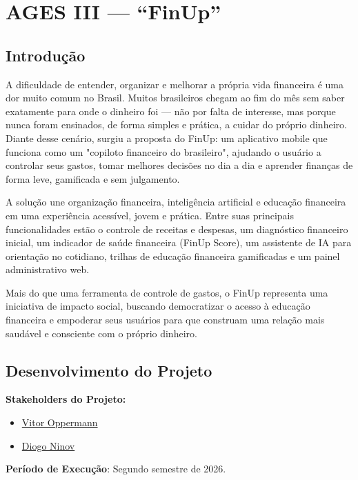 \chapter[AGES III --- FinUp]{AGES III --- \enquote{FinUp}}

\section{Introdução}

A dificuldade de entender, organizar e melhorar a própria vida
financeira é uma dor muito comum no Brasil. Muitos brasileiros chegam ao
fim do mês sem saber exatamente para onde o dinheiro foi --- não por
falta de interesse, mas porque nunca foram ensinados, de forma simples e
prática, a cuidar do próprio dinheiro. Diante desse cenário, surgiu a
proposta do FinUp: um aplicativo mobile que funciona como um "copiloto
financeiro do brasileiro", ajudando o usuário a controlar seus gastos,
tomar melhores decisões no dia a dia e aprender finanças de forma leve,
gamificada e sem julgamento.

A solução une organização financeira, inteligência artificial e educação
financeira em uma experiência acessível, jovem e prática. Entre suas
principais funcionalidades estão o controle de receitas e despesas, um
diagnóstico financeiro inicial, um indicador de saúde financeira (FinUp
Score), um assistente de IA para orientação no cotidiano, trilhas de
educação financeira gamificadas e um painel administrativo web.

Mais do que uma ferramenta de controle de gastos, o FinUp representa uma
iniciativa de impacto social, buscando democratizar o acesso à educação
financeira e empoderar seus usuários para que construam uma relação mais
saudável e consciente com o próprio dinheiro.

\section{Desenvolvimento do Projeto}

\textbf{Stakeholders do Projeto:}

\begin{itemize}
\item
  \href{https://tools.ages.pucrs.br/vitor.oppermann}{Vitor Oppermann}
\item
  \href{https://tools.ages.pucrs.br/diogo.ninov}{Diogo Ninov}
\end{itemize}

\textbf{Período de Execução}: Segundo semestre de 2026.

